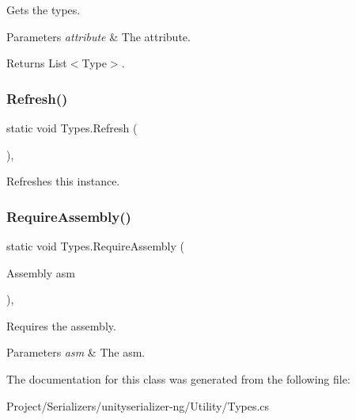 Gets the types. 


\begin{DoxyParams}{Parameters}
{\em attribute} & The attribute.\\
\hline
\end{DoxyParams}
\begin{DoxyReturn}{Returns}
List$<$Type$>$.
\end{DoxyReturn}
\mbox{\label{class_types_a4b66ac1c7bbb19873c851c1967ee2060}} 
\subsubsection{\texorpdfstring{Refresh()}{Refresh()}}
{\footnotesize\ttfamily static void Types.\+Refresh (\begin{DoxyParamCaption}{ }\end{DoxyParamCaption})\hspace{0.3cm}{\ttfamily [inline]}, {\ttfamily [static]}}



Refreshes this instance. 

\mbox{\label{class_types_a157e849f1304407e36661a88d1e2232a}} 
\subsubsection{\texorpdfstring{Require\+Assembly()}{RequireAssembly()}}
{\footnotesize\ttfamily static void Types.\+Require\+Assembly (\begin{DoxyParamCaption}\item[{Assembly}]{asm }\end{DoxyParamCaption})\hspace{0.3cm}{\ttfamily [inline]}, {\ttfamily [static]}}



Requires the assembly. 


\begin{DoxyParams}{Parameters}
{\em asm} & The asm.\\
\hline
\end{DoxyParams}


The documentation for this class was generated from the following file\+:\begin{DoxyCompactItemize}
\item 
Project/\+Serializers/unityserializer-\/ng/\+Utility/Types.\+cs\end{DoxyCompactItemize}
